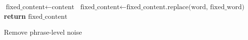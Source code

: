 \begin{algorithm}
    \begin{algorithmic}[1]
        \State $\text{fixed\_content} \gets \text{content}$
        \State $\text{fixed\_content} \gets \text{fixed\_content.replace(word, fixed\_word)}$
        \EndFor
        \State \textbf{return} $\text{fixed\_content}$
        \EndProcedure
    \end{algorithmic}
    \caption{Remove phrase-level noise}
    \label{alg:phrase_level_noise_fix}
\end{algorithm}


